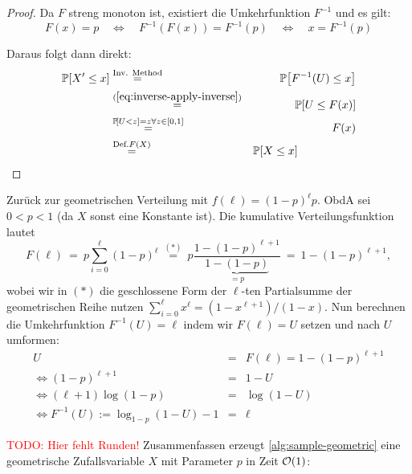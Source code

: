 \begin{proof}
    \noindent Da $F$ streng monoton ist, existiert die Umkehrfunktion $F^{-1}$ und es gilt:
    \begin{equation}\label{eq:inverse-apply-inverse}
        F(x) = p
        \quad\Leftrightarrow\quad F^{-1}(F(x)) = F^{-1}(p)
        \quad\Leftrightarrow\quad x = F^{-1}(p)
    \end{equation}

    \noindent Daraus folgt dann direkt:
    \begin{eqnarray}
        \prob{X' \le x} &\stackrel{\text{Inv. Method}} = & \prob{F^{-1}(U) \le x} \\
        &\stackrel{(\ref{eq:inverse-apply-inverse})}{=}& \prob{U \le F(x)} \\
        &\stackrel{\prob{U < z} = z \forall z \in [0, 1]}=& F(x) \\
        &\stackrel{\text{Def.} F(X)}=& \prob{X \le x} \hspace{5em}\hfill \qedhere
    \end{eqnarray}
\end{proof}

\bigskip
\bigskip

Zurück  zur geometrischen Verteilung mit $f(\ell) = (1-p)^\ell p$.
ObdA sei $0 < p < 1$ (da $X$ sonst eine Konstante ist).
Die kumulative Verteilungsfunktion lautet
\begin{equation}
    F(\ell)
    \ =\ p \sum_{i=0}^\ell (1-p)^\ell
    \ \stackrel{(*)}{=} \ p \frac{1 - (1-p)^{\ell+1}}{\underbrace{1 - (1-p)}_{=p}}
    \ = \ 1 - (1-p)^{\ell+1},
\end{equation}
wobei wir in $(*)$ die geschlossene Form der $\ell$-ten Partialsumme der geometrischen Reihe nutzen $\sum_{i=0}^\ell x^\ell = (1 - x^{\ell+1})/(1 - x)$.
Nun berechnen die Umkehrfunktion $F^{-1}(U) = \ell$ indem wir $F(\ell) = U$ setzen und nach $U$ umformen:
\begin{eqnarray}
    U &=& F(\ell) = 1 - (1-p)^{\ell+1} \\
    \Leftrightarrow (1-p)^{\ell+1} &=& 1 - U \\
    \Leftrightarrow  (\ell+1) \log(1-p)  &=& \log(1 - U) \\
    \Leftrightarrow  F^{-1}(U) := \log_{1-p}(1 - U) - 1 &=& \ell
\end{eqnarray}

\noindent
\textcolor{red}{TODO: Hier fehlt Runden!}
Zusammenfassen erzeugt \cref{alg:sample-geometric} eine geometrische Zufallsvariable $X$ mit Parameter $p$ in Zeit $\mathcal{O}\!\left(1\right)$:

